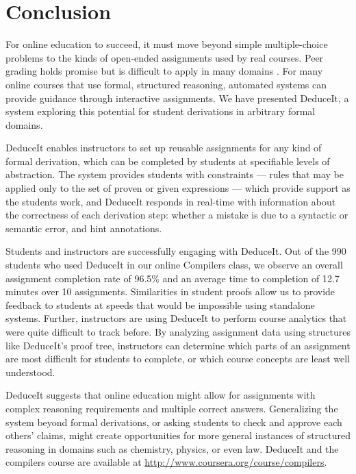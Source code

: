 \documentclass{sigchi}
\begin{document}

\section{Conclusion}

For online education to succeed, it must move beyond simple multiple-choice problems to the kinds of open-ended assignments used by real courses. Peer grading holds promise but is difficult to apply in many domains \cite{peer-consistency,chinmay-srk}. For many online courses that use formal, structured reasoning, automated systems can provide guidance through interactive assignments. We have presented DeduceIt, a system exploring this potential for student derivations in arbitrary formal domains. 

DeduceIt enables instructors to set up reusable assignments for any kind of formal derivation, which can be completed by students at specifiable levels of abstraction. The system provides students with constraints --- rules that may be applied only to the set of proven or given expressions --- which provide support as the students work, and DeduceIt responds in real-time with information about the correctness of each derivation step: whether a mistake is due to a syntactic or semantic error, and hint annotations.

Students and instructors are successfully engaging with DeduceIt. Out of the 990 students who used DeduceIt in our online Compilers class, we observe an overall assignment completion rate of 96.5\% and an average time to completion of 12.7 minutes over 10 assignments. Similarities in student proofs allow us to provide feedback to students at speeds that would be impossible using standalone systems. Further, instructors are using DeduceIt to perform course analytics that were quite difficult to track before. By analyzing assignment data using structures like DeduceIt's proof tree, instructors can determine which parts of an assignment are most difficult for students to complete, or which course concepts are least well understood.

DeduceIt suggests that online education might allow for assignments with complex reasoning requirements and multiple correct answers. Generalizing the system beyond formal derivations, or asking students to check and approve each others' claims, might create opportunities for more general instances of structured reasoning in domains such as chemistry, physics, or even law. DeduceIt and the compilers course are available at \url{http://www.coursera.org/course/compilers}.
\end{document}
